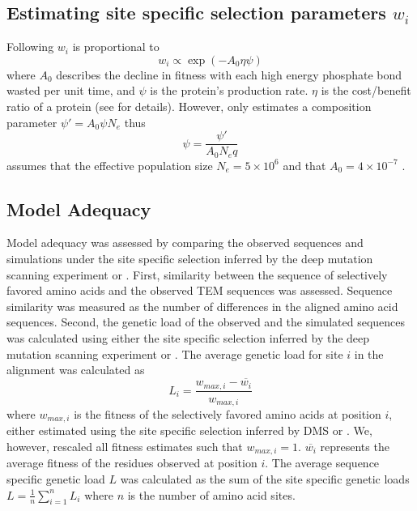 \subsection{Estimating site specific selection parameters $w_i$}

Following \citet{beaulieu2019} $w_i$ is proportional to
\begin{equation}
w_i \propto \exp(-A_0\eta\psi)
\end{equation}
where $A_0$ describes the decline in fitness with each high energy phosphate bond wasted per unit time, and $\psi$ is the protein's production rate.
$\eta$ is the cost/benefit ratio of a protein (see \citep{beaulieu2019} for details). 
However, \selac only estimates a composition parameter $\psi' = A_0\psi N_e$ thus
\begin{equation}
\psi = \frac{\psi'}{A_0N_eq}
\end{equation}
\selac assumes that the effective population size $N_e = 5\times 10^6$ and that $A_0 = 4 \times 10^{-7}$ \citep{gilchrist2007}.

\subsection{Model Adequacy}

Model adequacy was assessed by comparing the observed sequences and simulations under the site specific selection inferred by the deep mutation scanning experiment or \selac.
First, similarity between the sequence of selectively favored amino acids and the observed TEM sequences was assessed.
Sequence similarity was measured as the number of differences in the aligned amino acid sequences.
Second, the genetic load of the observed and the simulated sequences was calculated using either the site specific selection inferred by the deep mutation scanning experiment or \selac.
The average genetic load for site $i$ in the alignment was calculated as
\begin{equation}
L_i = \frac{w_{max,i} - \overline{w_i}}{w_{max,i}}
\end{equation}
where $w_{max,i}$ is the fitness of the selectively favored amino acids at position $i$, either estimated using the site specific selection inferred by DMS or \selac.
We, however, rescaled all fitness estimates such that $w_{max,i} = 1$.
$\overline{w_i}$ represents the average fitness of the residues observed at position $i$.
The average sequence specific genetic load $L$ was calculated as the sum of the site specific genetic loads $L = \frac{1}{n}\sum_{i=1}^n L_i$ where $n$ is the number of amino acid sites.

